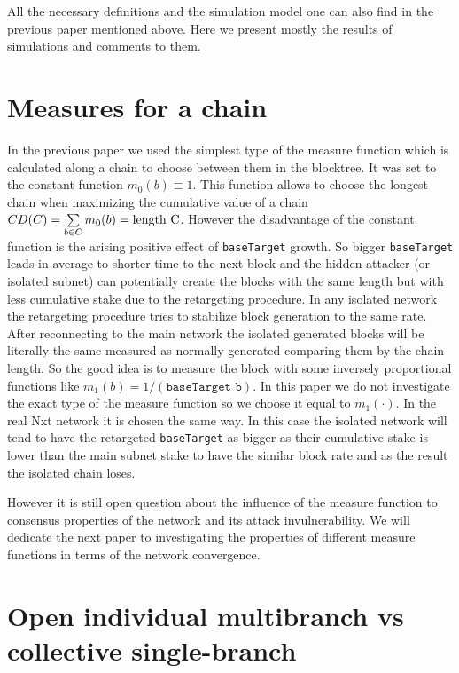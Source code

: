 \documentclass[12pt]{article}
\begin{document}
All the necessary definitions and the simulation model one can also find in the previous paper mentioned above. 
Here we present mostly the results of simulations and comments to them.

\section{Measures for a chain}

In the previous paper we used the simplest type of the measure function which is calculated along a chain to choose between them in the blocktree.
It was set to the constant function $m_0(b)\equiv 1$. This function allows to choose the longest chain when maximizing the cumulative value of a
chain $CD(C)=\sum\limits_{b\in C}m_0(b)=\rm{length}\ C$. However the disadvantage of the constant function is the arising positive effect of \texttt{baseTarget}
growth. So bigger \texttt{baseTarget} leads in average to shorter time to the next block and the hidden attacker (or isolated subnet) can potentially
create the blocks with the same length but with less cumulative stake due to the retargeting procedure. In any isolated network the retargeting procedure
tries to stabilize block generation to the same rate. After reconnecting to the main network the isolated generated blocks will be literally 
the same measured as normally generated comparing them by the chain length. So the good idea is to measure the block with 
some inversely proportional functions like $m_1(b)=1/(\texttt{baseTarget b})$. In this paper we do not investigate the exact type of 
the measure function so we choose it equal to $m_1(\cdot)$. 
In the real Nxt network it is chosen the same way. In this case the isolated network will tend to have the retargeted \texttt{baseTarget} as bigger as
their cumulative stake is lower than the main subnet stake to have the similar block rate and as the result the isolated chain loses. 

However it is still open question about the influence of the measure function to consensus properties of the network and its attack invulnerability.
We will dedicate the next paper to investigating the properties of different measure functions in terms of the network convergence.   

\section{Open individual multibranch vs collective single-branch}\label{attack1}
\end{document}
